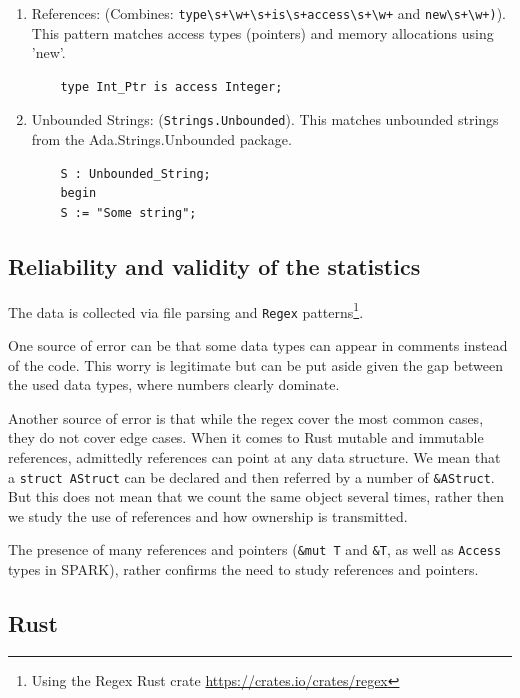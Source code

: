 \documentclass[nomenclature, english, bibtex]{kththesis}
\newcommand{\inlinecode}[1]{\texttt{#1}}
\begin{document}
\begin{enumerate}
    \item References: (Combines: \verb|type\s+\w+\s+is\s+access\s+\w+| and \verb|new\s+\w+)|). This pattern matches access types (pointers) and memory allocations using 'new'.

    \begin{verbatim}
    type Int_Ptr is access Integer;
    \end{verbatim}

    \item Unbounded Strings: (\verb|Strings.Unbounded|). This matches unbounded strings from the Ada.Strings.Unbounded package.

    \begin{verbatim}
    S : Unbounded_String;
    begin
    S := "Some string";
    \end{verbatim}
\end{enumerate}

 

\subsection{Reliability and validity of the statistics}

The data is collected via file parsing and \texttt{Regex} patterns\footnote{Using the Regex Rust crate \href{(documentation)}{https://crates.io/crates/regex}}. 

One source of error can be that some data types can appear in comments instead of the code. This worry is legitimate but can be put aside given the gap between the used data types, where numbers clearly dominate. 

Another source of error is that while the regex cover the most common cases, they do not cover edge cases.
When it comes to Rust mutable and immutable references, admittedly references can point at any data structure. We mean that a \inlinecode{struct AStruct} can be declared and then referred by a number of \inlinecode{\&AStruct}. But this does not mean that we count the same object several times, rather then we study the use of references and how ownership is transmitted. 

The presence of many references and pointers (\inlinecode{\&mut T} and \inlinecode{\&T}, as well as \inlinecode{Access} types in SPARK), rather confirms the need to study references and pointers.

\subsection{Rust}
\end{document}
